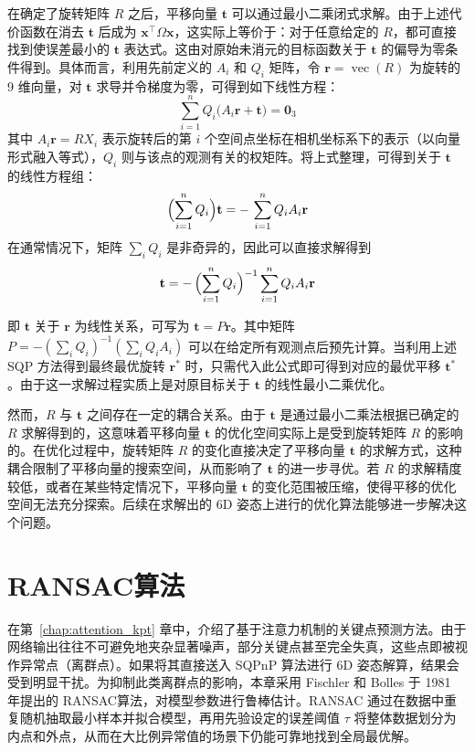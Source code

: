 在确定了旋转矩阵 $R$ 之后，平移向量 $\mathbf{t}$ 可以通过最小二乘闭式求解。由于上述代价函数在消去 $\mathbf{t}$ 后成为 $\mathbf{x}^\top \Omega \mathbf{x}$，这实际上等价于：对于任意给定的 $R$，都可直接找到使误差最小的 $\mathbf{t}$ 表达式。这由对原始未消元的目标函数关于 $\mathbf{t}$ 的偏导为零条件得到。具体而言，利用先前定义的 $A_i$ 和 $Q_i$ 矩阵，令 $\mathbf{r}=\operatorname{vec}(R)$ 为旋转的 9 维向量，对 $\mathbf{t}$ 求导并令梯度为零，可得到如下线性方程：
\begin{equation}
	\sum_{i=1}^{n} Q_i\bigl(A_i \mathbf{r}+\mathbf{t}\bigr)=\mathbf{0}_3
\end{equation}
其中 $A_i\mathbf{r}=R X_i$ 表示旋转后的第 $i$ 个空间点坐标在相机坐标系下的表示（以向量形式融入等式），$Q_i$ 则与该点的观测有关的权矩阵。将上式整理，可得到关于 $\mathbf{t}$ 的线性方程组：
\begin{equation}
	\Bigl(\sum_{i=1}^{n} Q_i\Bigr)\mathbf{t}
	=-\,\sum_{i=1}^{n} Q_i A_i \mathbf{r}
\end{equation}
在通常情况下，矩阵 $\sum_i Q_i$ 是非奇异的，因此可以直接求解得到
\begin{equation}
	\mathbf{t}
	=-\,\Bigl(\sum_{i=1}^{n} Q_i\Bigr)^{-1}
	\sum_{i=1}^{n} Q_i A_i \mathbf{r}
\end{equation}

即 $\mathbf{t}$ 关于 $\mathbf{r}$ 为线性关系，可写为 $\mathbf{t}=P\mathbf{r}$。其中矩阵 $P=-(\sum_i Q_i)^{-1}(\sum_i Q_i A_i)$ 可以在给定所有观测点后预先计算。当利用上述 SQP 方法得到最终最优旋转 $\mathbf{r}^{*}$ 时，只需代入此公式即可得到对应的最优平移 $\mathbf{t}^{*}$。由于这一求解过程实质上是对原目标关于 $\mathbf{t}$ 的线性最小二乘优化。

然而，$R$ 与 $\mathbf{t}$ 之间存在一定的耦合关系。由于 $\mathbf{t}$ 是通过最小二乘法根据已确定的 $R$ 求解得到的，这意味着平移向量 $\mathbf{t}$ 的优化空间实际上是受到旋转矩阵 $R$ 的影响的。在优化过程中，旋转矩阵 $R$ 的变化直接决定了平移向量 $\mathbf{t}$ 的求解方式，这种耦合限制了平移向量的搜索空间，从而影响了 $\mathbf{t}$ 的进一步寻优。若 $R$ 的求解精度较低，或者在某些特定情况下，平移向量 $\mathbf{t}$ 的变化范围被压缩，使得平移的优化空间无法充分探索。后续在求解出的 6D 姿态上进行的优化算法能够进一步解决这个问题。



\section{RANSAC算法}
\label{sec:ransac_pnp}

在第~\ref{chap:attention_kpt} 章中，介绍了基于注意力机制的关键点预测方法。由于网络输出往往不可避免地夹杂显著噪声，部分关键点甚至完全失真，这些点即被视作异常点（离群点）。如果将其直接送入 SQPnP 算法进行 6D 姿态解算，结果会受到明显干扰。为抑制此类离群点的影响，本章采用 Fischler 和 Bolles 于 1981 年提出的 RANSAC算法，对模型参数进行鲁棒估计。RANSAC 通过在数据中重复随机抽取最小样本并拟合模型，再用先验设定的误差阈值 $\tau$ 将整体数据划分为内点和外点，从而在大比例异常值的场景下仍能可靠地找到全局最优解。

